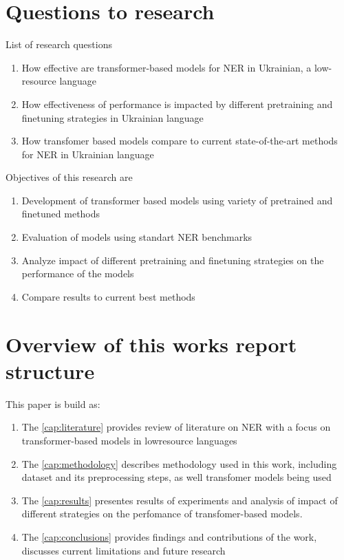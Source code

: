 \documentclass[a4paper,12pt]{report}
\begin{document}
\section{Questions to research}
List of research questions
\begin{enumerate}
    \item How effective are transformer-based models for NER in Ukrainian, a low-resource language
    \item How effectiveness of performance is impacted by different pretraining and finetuning strategies in Ukrainian language
    \item How transfomer based models compare to current state-of-the-art methods for NER in Ukrainian language
\end{enumerate}
Objectives of this research are
\begin{enumerate}
    \item Development of transformer based models using variety of pretrained and finetuned methods
    \item Evaluation of models using standart NER benchmarks
    \item Analyze impact of different pretraining and finetuning strategies on the performance of the models
    \item Compare results to current best methods
\end{enumerate}

\section{Overview of this works report structure}
This paper is build as:
\begin{enumerate}
    \item The \autoref{cap:literature} provides review of literature on NER with a focus on transformer-based models in lowresource languages
    \item The \autoref{cap:methodology} describes methodology used in this work, including dataset and its preprocessing steps, as well transfomer models being used
    \item The \autoref{cap:results} presentes results of experiments and analysis of impact of different strategies on the perfomance of transfomer-based models.
    \item The \autoref{cap:conclusions} provides findings and contributions of the work, discusses current limitations and future research
\end{enumerate}
\end{document}
